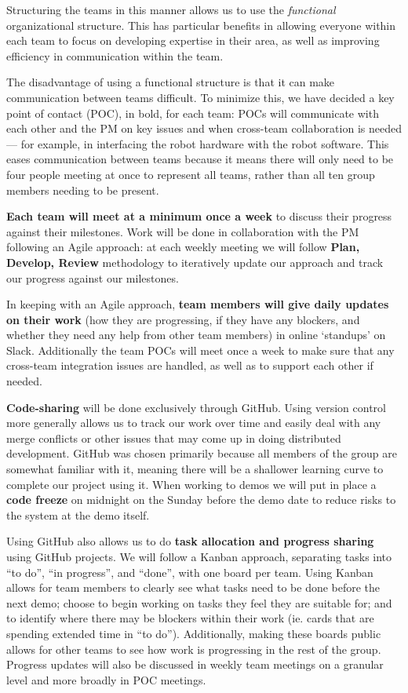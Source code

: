 \documentclass{article}
\begin{document}
Structuring the teams in this manner allows us to use the {\it functional} organizational structure. This has particular benefits in allowing everyone within each team to focus on developing expertise in their area, as well as improving efficiency in communication within the team.

The disadvantage of using a functional structure is that it can make communication between teams difficult. To minimize this, we have decided a key point of contact (POC), in bold, for each team: POCs will communicate with each other and the PM on key issues and when cross-team collaboration is needed --- for example, in interfacing the robot hardware with the robot software. This eases communication between teams because it means there will only need to be four people meeting at once to represent all teams, rather than all ten group members needing to be present.

{\bf Each team will meet at a minimum once a week} to discuss their progress against their milestones. Work will be done in collaboration with the PM following an Agile approach: at each weekly meeting we will follow {\bf Plan, Develop, Review} methodology to iteratively update our approach and track our progress against our milestones.

In keeping with an Agile approach, {\bf team members will give daily updates on their work} (how they are progressing, if they have any blockers, and whether they need any help from other team members) in online `standups' on Slack. Additionally the team POCs will meet once a week to make sure that any cross-team integration issues are handled, as well as to support each other if needed. 

{\bf Code-sharing} will be done exclusively through GitHub. Using version control more generally allows us to track our work over time and easily deal with any merge conflicts or other issues that may come up in doing distributed development. GitHub was chosen primarily because all members of the group are somewhat familiar with it, meaning there will be a shallower learning curve to complete our project using it. When working to demos we will put in place a {\bf code freeze} on midnight on the Sunday before the demo date to reduce risks to the system at the demo itself. 

Using GitHub also allows us to do {\bf task allocation and progress sharing} using GitHub projects. We will follow a Kanban approach, separating tasks into ``to do'', ``in progress'', and ``done'', with one board per team. Using Kanban allows for team members to clearly see what tasks need to be done before the next demo; choose to begin working on tasks they feel they are suitable for; and to identify where there may be blockers within their work (ie. cards that are spending extended time in ``to do''). Additionally, making these boards public allows for other teams to see how work is progressing in the rest of the group. Progress updates will also be discussed in weekly team meetings on a granular level and more broadly in POC meetings.
\end{document}
